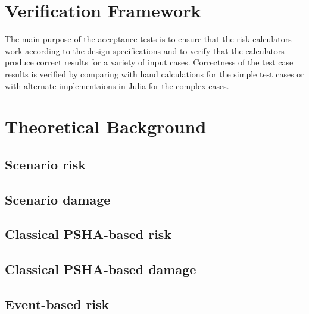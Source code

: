 \section{Verification Framework}
The main purpose of the acceptance tests is to ensure that the risk calculators work according to the design specifications and to verify that the calculators produce correct results for a variety of input cases. Correctness of the test case results is verified by comparing with hand calculations for the simple test cases or with alternate implementaions in Julia for the complex cases.

\section{Theoretical Background}
%    
\subsection{Scenario risk}
   \label{subsec:theory-sr}
   
\subsection{Scenario damage}
   \label{subsec:theory-sd}
   
\subsection{Classical PSHA-based risk}
   \label{subsec:theory-cr}
   
\subsection{Classical PSHA-based damage}
   \label{subsec:theory-cd}
   
\subsection{Event-based risk}
   \label{subsec:theory-ebr}
   
   \cleardoublepage